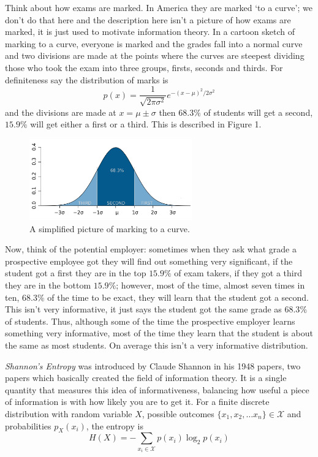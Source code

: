 \documentclass[11pt,a4paper]{scrartcl}
\begin{document}
Think about how exams are marked. In America they are marked \lq{}to a
curve\rq{}; we don't do that here and the description here isn't a
picture of how exams are marked, it is just used to motivate
information theory. In a cartoon sketch of marking to a curve,
everyone is marked and the grades fall into a normal curve and two
divisions are made at the points where the curves are steepest
dividing those who took the exam into three groups, firsts, seconds
and thirds. For definiteness say the distribution of marks is 
\begin{equation}
p(x)=\frac{1}{\sqrt{2\pi\sigma^2}}e^{-(x-\mu)^2/2\sigma^2}
\end{equation}
and the divisions are made at $x=\mu\pm\sigma$ then $68.3\%$ of
students will get a second, $15.9\%$ will get either a first or a
third. This is described in Figure 1.

\begin{figure}
\begin{center}
\includegraphics[width=7cm]{marked_to_curve.png}
\end{center}
\caption{A simplified picture of marking to a curve.}
\end{figure}

Now, think of the potential employer: sometimes when they ask what
grade a prospective employee got they will find out something very
significant, if the student got a first they are in the top $15.9\%$
of exam takers, if they got a third they are in the bottom $15.9\%$;
however, most of the time, almost seven times in ten, $68.3\%$ of the
time to be exact, they will learn that the student got a second. This
isn't very informative, it just says the student got the same grade as
$68.3\%$ of students. Thus, although some of the time the prospective
employer learns something very informative, most of the time they
learn that the student is about the same as most students. On average
this isn't a very informative distribution. 

\textsl{Shannon's Entropy} was introduced by Claude Shannon in his 1948 papers,
two papers which basically created the field of information theory. It
is a single quantity that measures this idea of informativeness,
balancing how useful a piece of information is with how likely you are
to get it. For a finite discrete distribution with random variable $X$,
possible outcomes $\{x_1,x_2,\ldots x_n\}\in\mathcal{X}$ and
probabilities $p_X(x_i)$, the entropy is
\begin{equation}
H(X)=-\sum_{x_i\in \mathcal{X}}{p(x_i)\log_2p(x_i)}
\end{equation}
\end{document}
